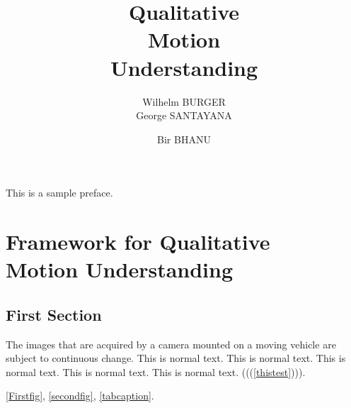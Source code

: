 





\title{Qualitative\\ Motion\\ Understanding}

\titlepage

\author{Wilhelm BURGER\\ George SANTAYANA}

\author{Bir BHANU}



\authortitlepage



\tableofcontents

\preface
This is a sample preface.

\chapter{Framework for Qualitative\\ 
Motion Understanding}




\section{First Section \label{thistest}}
The images that are acquired by a camera mounted on a moving vehicle 
are subject to continuous change. 
This is normal text. This is normal text. This is normal text.
This is normal text. This is normal text.
(((\ref{thistest}))). 

\ref{Firstfig}, \ref{secondfig}, \ref{tabcaption}.





